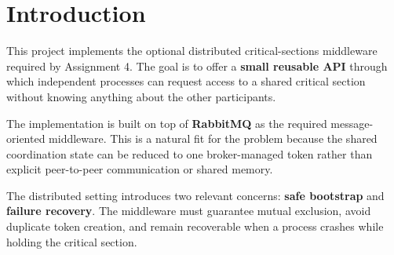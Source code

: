 \clearpage
\section{Introduction}

This project implements the optional distributed critical-sections middleware
required by Assignment 4. The goal is to offer a \textbf{small reusable API}
through which independent processes can request access to a shared critical
section without knowing anything about the other participants.

The implementation is built on top of \textbf{RabbitMQ} as the required
message-oriented middleware. This is a natural fit for the problem because the
shared coordination state can be reduced to one broker-managed token rather
than explicit peer-to-peer communication or shared memory.

The distributed setting introduces two relevant concerns:
\textbf{safe bootstrap} and \textbf{failure recovery}. The middleware must
guarantee mutual exclusion, avoid duplicate token creation, and remain
recoverable when a process crashes while holding the critical section.

